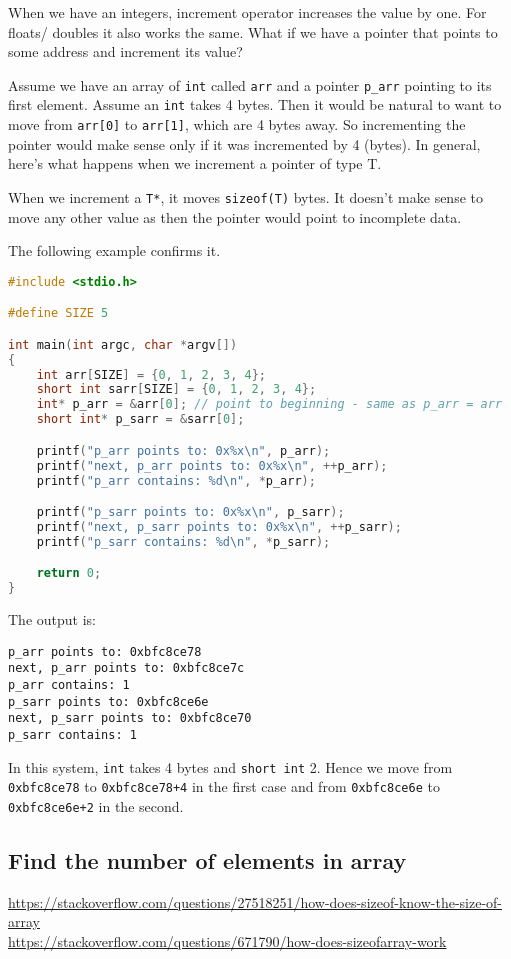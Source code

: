 \documentclass[a4paper]{article}
\begin{document}
When we have an integers, increment operator increases the value by one. For floats/ doubles it also works the same. What if we have a pointer that points to some address and increment its value? 

Assume we have an array of \texttt{int} called \texttt{arr} and a pointer \texttt{p\_arr} pointing to its first element. Assume  an \texttt{int} takes 4 bytes. Then it would be natural to want to move from \texttt{arr[0]} to \texttt{arr[1]}, which are 4 bytes away. So incrementing the pointer would make sense only if it was incremented by 4 (bytes). In general, here's what happens when we increment a pointer of type T. 
\begin{takeaway}
When we increment a \texttt{T*}, it moves \texttt{sizeof(T)} bytes. It doesn't make sense to move any other value as then the pointer would point to incomplete data.
\end{takeaway}
The following example confirms it.
\begin{exmp}
\begin{lstlisting}[language=c]
#include <stdio.h>

#define SIZE 5

int main(int argc, char *argv[])
{
	int arr[SIZE] = {0, 1, 2, 3, 4};
	short int sarr[SIZE] = {0, 1, 2, 3, 4};
	int* p_arr = &arr[0]; // point to beginning - same as p_arr = arr 
	short int* p_sarr = &sarr[0];

	printf("p_arr points to: 0x%x\n", p_arr);
	printf("next, p_arr points to: 0x%x\n", ++p_arr);
	printf("p_arr contains: %d\n", *p_arr);

	printf("p_sarr points to: 0x%x\n", p_sarr);
	printf("next, p_sarr points to: 0x%x\n", ++p_sarr);
	printf("p_sarr contains: %d\n", *p_sarr);

	return 0;
}
\end{lstlisting}
\end{exmp}
The output is:
\begin{verbatim}
p_arr points to: 0xbfc8ce78
next, p_arr points to: 0xbfc8ce7c
p_arr contains: 1
p_sarr points to: 0xbfc8ce6e
next, p_sarr points to: 0xbfc8ce70
p_sarr contains: 1
\end{verbatim}
In this system, \texttt{int} takes 4 bytes and \texttt{short int} 2. Hence we move from \texttt{0xbfc8ce78} to \texttt{0xbfc8ce78+4} in the first case and from \texttt{0xbfc8ce6e} to \texttt{0xbfc8ce6e+2} in the second.



\newpage
\subsection{Find the number of elements in array}

\url{https://stackoverflow.com/questions/27518251/how-does-sizeof-know-the-size-of-array}\\
\url{https://stackoverflow.com/questions/671790/how-does-sizeofarray-work}\\
\end{document}
